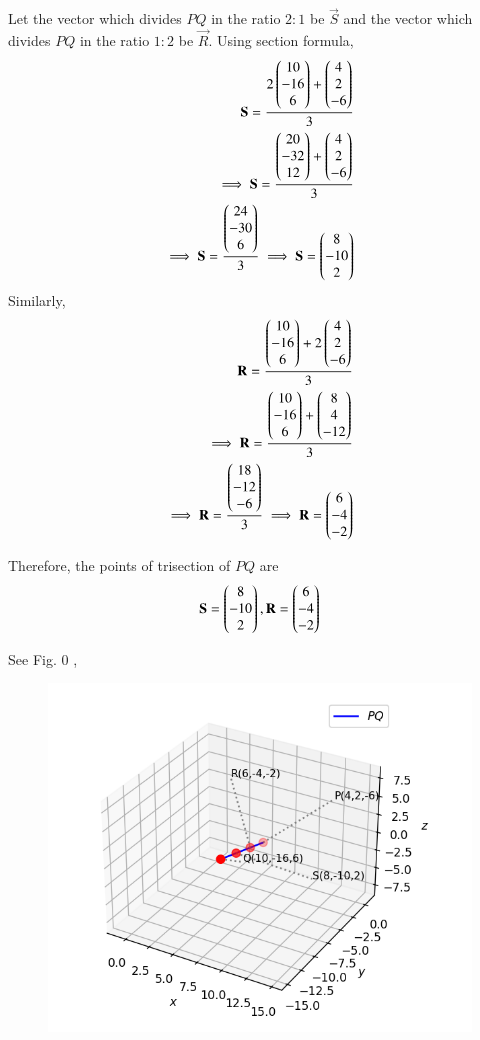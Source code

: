 \documentclass[journal]{IEEEtran}
\begin{document}
Let the vector which divides $PQ$ in the ratio $2:1$ be $\vec{S}$ and the vector which divides $PQ$ in the ratio $1:2$ be $\vec{R}$.
Using section formula,\\
\begin{align*}
    \mathbf{S} = \frac{2\begin{pmatrix}10\\-16\\6\end{pmatrix}+\begin{pmatrix}4\\2\\-6\end{pmatrix}}{3}\\
    \implies \mathbf{S} = \frac{\begin{pmatrix}20\\-32\\12\end{pmatrix}+\begin{pmatrix}4\\2\\-6\end{pmatrix}}{3}\\
    \implies \mathbf{S} = \frac{\begin{pmatrix}24\\-30\\6\end{pmatrix}}{3} 
    \implies \mathbf{S} = \begin{pmatrix}8\\-10\\2\end{pmatrix}\\
\end{align*}
Similarly,
\begin{align*}
    \mathbf{R} = \frac{\begin{pmatrix}10\\-16\\6\end{pmatrix}+2\begin{pmatrix}4\\2\\-6\end{pmatrix}}{3}\\
    \implies \mathbf{R} = \frac{\begin{pmatrix}10\\-16\\6\end{pmatrix}+\begin{pmatrix}8\\4\\-12\end{pmatrix}}{3}\\
    \implies \mathbf{R} = \frac{\begin{pmatrix}18\\-12\\-6\end{pmatrix}}{3} 
    \implies \mathbf{R} = \begin{pmatrix}6\\-4\\-2\end{pmatrix}\\
\end{align*}

Therefore, the points of trisection of $PQ$ are\\
\begin{align*}
    \mathbf{S}=\begin{pmatrix}8\\-10\\2\end{pmatrix} ,\mathbf{R}=\begin{pmatrix}6\\-4\\-2\end{pmatrix}
\end{align*}

\bigskip

See Fig. 0 ,
\begin{figure}[H]
\begin{center}
\includegraphics[width=0.6\columnwidth]{figs/fig.png}
\end{center}
\caption{}
\label{fig:Fig1}
\end{figure}
\end{document}
